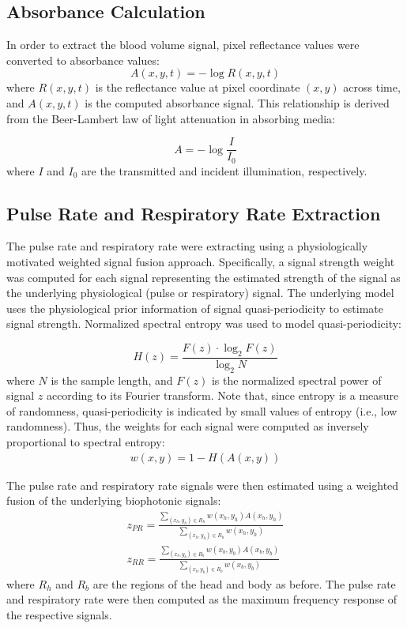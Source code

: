 \documentclass{article}
\begin{document}
\subsection{Absorbance Calculation}
In order to extract the blood volume signal, pixel reflectance values were converted to absorbance values:
\begin{equation}
A(x,y,t) = -\log R(x,y,t)
\end{equation}
where $R(x,y,t)$ is the reflectance value at pixel coordinate $(x,y)$ across time, and $A(x,y,t)$ is the computed absorbance signal. This relationship is derived from the Beer-Lambert law of light attenuation in absorbing media:

\begin{equation}
A = -\log \frac{I}{I_0}
\end{equation}
where $I$ and $I_0$ are the transmitted and incident illumination, respectively.

\subsection{Pulse Rate and Respiratory Rate Extraction}
The pulse rate and respiratory rate were extracting using a physiologically motivated weighted signal fusion approach. Specifically, a signal strength weight was computed for each signal representing the estimated strength of the signal as the underlying physiological (pulse or respiratory) signal. The underlying model uses the physiological prior information of signal quasi-periodicity to estimate signal strength. Normalized spectral entropy was used to model quasi-periodicity:

\begin{equation}
H(z) = \frac{F(z) \cdot \log_2 F(z)}{\log_2 N}
\end{equation}
where $N$ is the sample length, and $F(z)$ is the normalized spectral power of signal $z$ according to its Fourier transform. Note that, since entropy is a measure of randomness, quasi-periodicity is indicated by small values of entropy (i.e., low randomness). Thus, the weights for each signal were computed as inversely proportional to spectral entropy:
\begin{align}
w(x,y) = 1-H(A(x,y))
\label{eq:weights}
\end{align}

The pulse rate and respiratory rate signals were then estimated using a weighted fusion of the underlying biophotonic signals:
\begin{align}
z_{PR} = \frac{\sum_{(x_h,y_h) \in R_h} w(x_h,y_h) A(x_h,y_h)}{\sum_{(x_h,y_h) \in R_h} w(x_h,y_h)} \label{eq:z_PR} \\
z_{RR} = \frac{\sum_{(x_b,y_b) \in R_b} w(x_b,y_b) A(x_b,y_b)}{\sum_{(x_b,y_b) \in R_b} w(x_b,y_b)} \label{eq:z_RR}
\end{align}
where $R_h$ and $R_b$ are the regions of the head and body as before. The pulse rate and respiratory rate were then computed as the maximum frequency response of the respective signals.
\end{document}

